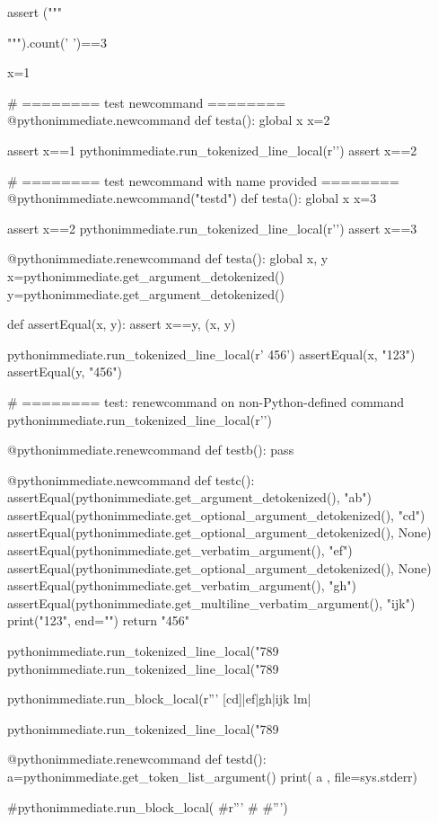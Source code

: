 \documentclass[a5paper]{article}
\begin{document}
\begin{pycode}
assert ("""
   
""").count(' ')==3

x=1

# ======== test newcommand ========
@pythonimmediate.newcommand
def testa():
	global x
	x=2

assert x==1
pythonimmediate.run_tokenized_line_local(r'\testa')
assert x==2

# ======== test newcommand with name provided ========
@pythonimmediate.newcommand("testd")
def testa():
	global x
	x=3

assert x==2
pythonimmediate.run_tokenized_line_local(r'\testd')
assert x==3

@pythonimmediate.renewcommand
def testa():
	global x, y
	x=pythonimmediate.get_argument_detokenized()
	y=pythonimmediate.get_argument_detokenized()


def assertEqual(x, y):
	assert x==y, (x, y)


pythonimmediate.run_tokenized_line_local(r' {456}')
assertEqual(x, "123")
assertEqual(y, "456")


# ======== test: renewcommand on non-Python-defined command
pythonimmediate.run_tokenized_line_local(r'\def \testb {}')

@pythonimmediate.renewcommand
def testb(): pass



@pythonimmediate.newcommand
def testc():
	assertEqual(pythonimmediate.get_argument_detokenized(), "ab")
	assertEqual(pythonimmediate.get_optional_argument_detokenized(), "cd")
	assertEqual(pythonimmediate.get_optional_argument_detokenized(), None)
	assertEqual(pythonimmediate.get_verbatim_argument(), "ef")
	assertEqual(pythonimmediate.get_optional_argument_detokenized(), None)
	assertEqual(pythonimmediate.get_verbatim_argument(), "gh")
	assertEqual(pythonimmediate.get_multiline_verbatim_argument(), "ijk\nlm")
	print("123", end="")
	return "456"

pythonimmediate.run_tokenized_line_local("789%
pythonimmediate.run_tokenized_line_local("789%

pythonimmediate.run_block_local(r''' [cd]|ef|{gh}|ijk
lm|%

pythonimmediate.run_tokenized_line_local("789%



@pythonimmediate.renewcommand
def testd():
	a=pythonimmediate.get_token_list_argument()
	print(
			a
			, file=sys.stderr)

#pythonimmediate.run_block_local(
#r'''
#
#''')
\end{pycode}
\end{document}
